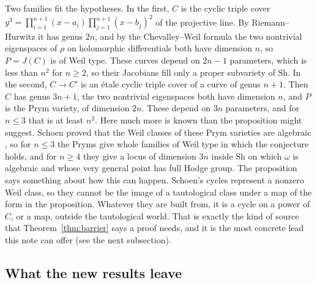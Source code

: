\documentclass[11pt]{amsart}
\theoremstyle{definition}
\theoremstyle{remark}
\newcommand{\Sh}{\mathrm{Sh}}
\begin{document}
Two families fit the hypotheses. In the first, $C$ is the cyclic triple
cover $y^{3}=\prod_{i=1}^{n+1}(x-a_{i})\prod_{j=1}^{n+1}(x-b_{j})^{2}$ of
the projective line. By Riemann--Hurwitz it has genus $2n$, and by the
Chevalley--Weil formula the two nontrivial eigenspaces of $\rho$ on
holomorphic differentials both have dimension $n$, so $P=J(C)$ is of Weil
type. These curves depend on $2n-1$ parameters, which is less than $n^{2}$
for $n\ge2$, so their Jacobians fill only a proper subvariety of $\Sh$. In
the second, $C\to C'$ is an \'etale cyclic triple cover of a curve of genus
$n+1$. Then $C$ has genus $3n+1$, the two nontrivial eigenspaces both have
dimension $n$, and $P$ is the Prym variety, of dimension $2n$. These
depend on $3n$ parameters, and for $n\le3$ that is at least $n^{2}$. Here
much more is known than the proposition might suggest. Schoen proved that
the Weil classes of these Prym varieties are algebraic \cite{Sch88}, so for
$n\le3$ the Pryms give whole families of Weil type in which the conjecture
holds, and for $n\ge4$ they give a locus of dimension $3n$ inside $\Sh$ on
which $\omega$ is algebraic and whose very general point has full Hodge
group. The proposition says something about how this can happen. Schoen's
cycles represent a nonzero Weil class, so they cannot be the image of a
tautological class under a map of the form in the proposition. Whatever
they are built from, it is a cycle on a power of $C$, or a map, outside the
tautological world. That is exactly the kind of source that
Theorem~\ref{thm:barrier} says a proof needs, and it is the most concrete
lead this note can offer (see the next subsection).

\subsection{What the new results leave}
\end{document}
